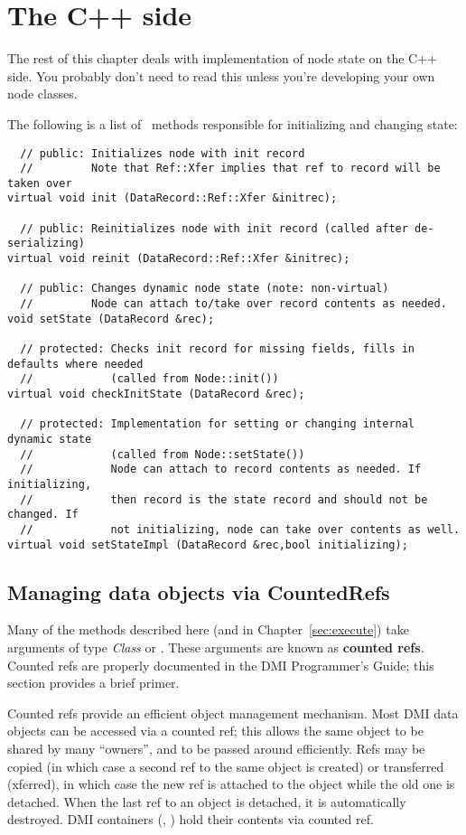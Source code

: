 \section{The C++ side}

  The rest of this chapter deals with implementation of node state on the C++
  side. You probably don't need to read this unless you're developing your own
  node classes.
  
  The following is a list of \Node\ methods responsible for initializing and
  changing state:

\begin{verbatim}
  // public: Initializes node with init record
  //         Note that Ref::Xfer implies that ref to record will be taken over
virtual void init (DataRecord::Ref::Xfer &initrec);

  // public: Reinitializes node with init record (called after de-serializing)
virtual void reinit (DataRecord::Ref::Xfer &initrec);

  // public: Changes dynamic node state (note: non-virtual)
  //         Node can attach to/take over record contents as needed.
void setState (DataRecord &rec);

  // protected: Checks init record for missing fields, fills in defaults where needed
  //            (called from Node::init())
virtual void checkInitState (DataRecord &rec);

  // protected: Implementation for setting or changing internal dynamic state 
  //            (called from Node::setState())
  //            Node can attach to record contents as needed. If initializing,
  //            then record is the state record and should not be changed. If
  //            not initializing, node can take over contents as well.
virtual void setStateImpl (DataRecord &rec,bool initializing);
\end{verbatim}

\subsection{Managing data objects via CountedRefs}

  Many of the methods described here (and in Chapter~\ref{sec:execute})
  take arguments of type {\sl Class} or .
  These arguments are known as {\bf counted refs}. Counted refs are properly
  documented in the DMI Programmer's Guide; this section provides a brief
  primer.
  
  Counted refs provide an efficient object management mechanism. Most DMI data
  objects can be accessed via a counted ref; this allows the same object to be
  shared by many ``owners'', and to be passed around efficiently. Refs may be
  copied (in which case a second ref to the same object is created) or
  transferred (xferred), in which case the new ref is attached to the object
  while the old one is detached. When the last ref to an object is detached, it
  is automatically destroyed. DMI containers (, )
  hold their contents via counted ref. 
  
